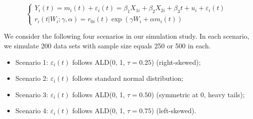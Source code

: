\begin{equation}\label{eqn:p2simjoint}
\left\{
\begin{array}{l}
Y_{i}(t) = m_i(t) + \varepsilon_{i}(t) = \beta_1X_{1i} + \beta_2X_{2i} + \beta_3t + u_i + \varepsilon_{i}(t)\\
r_i(t|W_i;  \gamma, \alpha) = r_{0i}(t)\exp(\gamma W_i + \alpha m_i(t))
\end{array}
\right.
\end{equation}


We consider the following four scenarios in our simulation study. In each scenario, we simulate 200 data sets with sample size equals 250 or 500 in each.
\begin{itemize}
\item Scenario 1: $\varepsilon_{i}(t)$ follows ALD(0, 1, $\tau=0.25$) (right-skewed);
\item Scenario 2: $\varepsilon_{i}(t)$ follows standard normal distribution;
\item Scenario 3: $\varepsilon_{i}(t)$ follows ALD(0, 1, $\tau=0.50$) (symmetric at 0, heavy tails);
\item Scenario 4: $\varepsilon_{i}(t)$ follows ALD(0, 1, $\tau=0.75$) (left-skewed).
\end{itemize}

